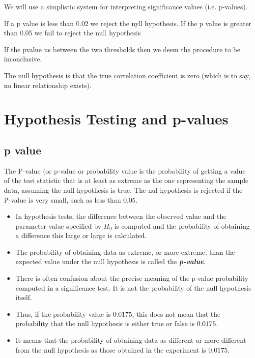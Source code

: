 \documentclass[]{report}
\begin{document}
	We will use a simplistic system for interpreting significance values (i.e. p-values).
	
	If a p value is less than 0.02 we reject the nyll hypothesis.
	If the p value is greater than 0.05 we fail to reject the null hypothesis
	
	If the pvalue us between the two thresholds then we deem the procedure to be inconclusive. 
	
	The null hypothesis is that the true correlation coefficient is zero (which is to say, no linear relationship exists).

	\section{Hypothesis Testing and p-values}
	{
		\subsection{p value}
		The P-value (or p-value or probability value is the probability of getting a value of the test statistic that is at least as extreme as the one representing the sample data, assuming the null hypothesis is true.
		The nul hypothesis is rejected if the P-value is very small, such as less than 0.05.
		
	}
	
	
	
	\begin{itemize}
		\item In hypothesis tests, the difference between the observed value and the parameter value specified by $H_0$ is computed and the probability of obtaining a difference this large or large is calculated.
		\item The probability of obtaining data as extreme, or more extreme, than the expected value under the null hypothesis is called the \textbf{\emph{p-value}}.
		\item There is often confusion about the precise meaning of the p-value probability computed in a significance test. It is not the probability of the null hypothesis itself.
		\item Thus, if the probability value is $0.0175$, this does not mean that the probability that the null hypothesis is either true or false is $0.0175$.
		\item It means that the probability of obtaining data as different or more different from the null hypothesis as those obtained in the experiment is $0.0175$.
	\end{itemize}
	
\end{document}

